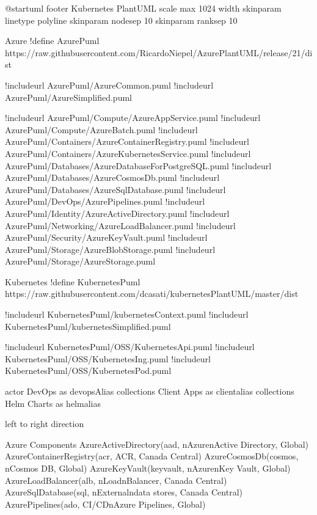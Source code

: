 \documentclass[letterpaper,10pt,english]{sphinxmanual}
\begin{document}
%
\begin{sphinxVerbatim}[commandchars=\\\{\},numbers=left,firstnumber=1,stepnumber=1]
@startuml
footer Kubernetes Plant\PYGZhy{}UML
scale max 1024 width
skinparam linetype polyline
skinparam nodesep 10
skinparam ranksep 10



\PYGZsq{} Azure
!define AzurePuml https://raw.githubusercontent.com/RicardoNiepel/Azure\PYGZhy{}PlantUML/release/2\PYGZhy{}1/dist

!includeurl AzurePuml/AzureCommon.puml
!includeurl AzurePuml/AzureSimplified.puml

!includeurl AzurePuml/Compute/AzureAppService.puml
!includeurl AzurePuml/Compute/AzureBatch.puml
!includeurl AzurePuml/Containers/AzureContainerRegistry.puml
!includeurl AzurePuml/Containers/AzureKubernetesService.puml
!includeurl AzurePuml/Databases/AzureDatabaseForPostgreSQL.puml
!includeurl AzurePuml/Databases/AzureCosmosDb.puml
!includeurl AzurePuml/Databases/AzureSqlDatabase.puml
!includeurl AzurePuml/DevOps/AzurePipelines.puml
!includeurl AzurePuml/Identity/AzureActiveDirectory.puml
!includeurl AzurePuml/Networking/AzureLoadBalancer.puml
!includeurl AzurePuml/Security/AzureKeyVault.puml
!includeurl AzurePuml/Storage/AzureBlobStorage.puml
!includeurl AzurePuml/Storage/AzureStorage.puml

\PYGZsq{} Kubernetes
!define KubernetesPuml https://raw.githubusercontent.com/dcasati/kubernetes\PYGZhy{}PlantUML/master/dist

!includeurl KubernetesPuml/kubernetes\PYGZus{}Context.puml
!includeurl KubernetesPuml/kubernetes\PYGZus{}Simplified.puml

!includeurl KubernetesPuml/OSS/KubernetesApi.puml
!includeurl KubernetesPuml/OSS/KubernetesIng.puml
!includeurl KubernetesPuml/OSS/KubernetesPod.puml

actor \PYGZdq{}DevOps\PYGZdq{} as devopsAlias
collections \PYGZdq{}Client Apps\PYGZdq{} as clientalias
collections \PYGZdq{}Helm Charts\PYGZdq{} as helmalias

left to right direction

\PYGZsq{} Azure Components
AzureActiveDirectory(aad, \PYGZdq{}\PYGZbs{}nAzure\PYGZbs{}nActive Directory\PYGZdq{}, \PYGZdq{}Global\PYGZdq{})
AzureContainerRegistry(acr, \PYGZdq{}ACR\PYGZdq{}, \PYGZdq{}Canada Central\PYGZdq{})
AzureCosmosDb(cosmos, \PYGZdq{}\PYGZbs{}nCosmos DB\PYGZdq{}, \PYGZdq{}Global\PYGZdq{})
AzureKeyVault(keyvault, \PYGZdq{}\PYGZbs{}nAzure\PYGZbs{}nKey Vault\PYGZdq{}, \PYGZdq{}Global\PYGZdq{})
AzureLoadBalancer(alb, \PYGZdq{}\PYGZbs{}nLoad\PYGZbs{}nBalancer\PYGZdq{}, \PYGZdq{}Canada Central\PYGZdq{})
AzureSqlDatabase(sql, \PYGZdq{}\PYGZbs{}nExternal\PYGZbs{}ndata stores\PYGZdq{}, \PYGZdq{}Canada Central\PYGZdq{})
AzurePipelines(ado, \PYGZdq{}CI/CD\PYGZbs{}nAzure Pipelines\PYGZdq{}, \PYGZdq{}Global\PYGZdq{})


\end{sphinxVerbatim}
\end{document}
